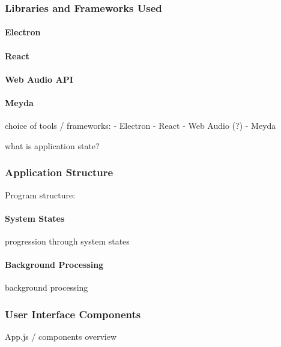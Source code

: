 \subsubsection{Libraries and Frameworks Used}
\label{subsubsec:som-browser_libraries}

\paragraph{Electron}
\label{para:electron}

\paragraph{React}
\label{para:react}

\paragraph{Web Audio API}
\label{para:web_audio_api}

\paragraph{Meyda}
\label{para:meyda}

choice of tools / frameworks:
- Electron
- React
- Web Audio (?)
- Meyda

what is application state?

\subsubsection{Application Structure}
\label{subsubsec:som-browser_structure}

Program structure:

\paragraph{System States}
\label{para:som-browser_states}
progression through system states

\paragraph{Background Processing}
\label{para:som-browser_background_processing}
background processing

\subsubsection{User Interface Components}
\label{subsubsec:som-browser_components}
App.js / components overview

